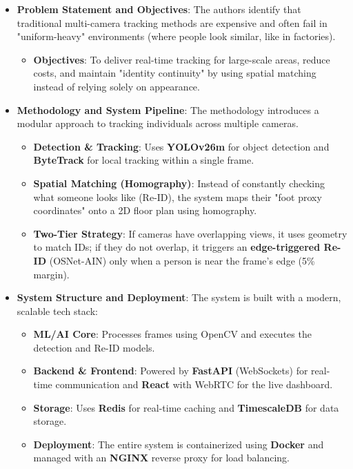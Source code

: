 \begin{itemize}
    \item \textbf{Problem Statement and Objectives}: The authors identify that traditional multi-camera tracking methods are expensive and often fail in "uniform-heavy" environments (where people look similar, like in factories).
    \begin{itemize}
        \item \textbf{Objectives}: To deliver real-time tracking for large-scale areas, reduce costs, and maintain "identity continuity" by using spatial matching instead of relying solely on appearance.
    \end{itemize}
    
    \item \textbf{Methodology and System Pipeline}: The methodology introduces a modular approach to tracking individuals across multiple cameras.
    \begin{itemize}
        \item \textbf{Detection \& Tracking}: Uses \textbf{YOLOv26m} for object detection and \textbf{ByteTrack} for local tracking within a single frame.
        \item \textbf{Spatial Matching (Homography)}: Instead of constantly checking what someone looks like (Re-ID), the system maps their "foot proxy coordinates" onto a 2D floor plan using homography.
        \item \textbf{Two-Tier Strategy}: If cameras have overlapping views, it uses geometry to match IDs; if they do not overlap, it triggers an \textbf{edge-triggered Re-ID} (OSNet-AIN) only when a person is near the frame's edge (5\% margin).
    \end{itemize}
    
    \item \textbf{System Structure and Deployment}: The system is built with a modern, scalable tech stack:
    \begin{itemize}
        \item \textbf{ML/AI Core}: Processes frames using OpenCV and executes the detection and Re-ID models.
        \item \textbf{Backend \& Frontend}: Powered by \textbf{FastAPI} (WebSockets) for real-time communication and \textbf{React} with WebRTC for the live dashboard.
        \item \textbf{Storage}: Uses \textbf{Redis} for real-time caching and \textbf{TimescaleDB} for data storage.
        \item \textbf{Deployment}: The entire system is containerized using \textbf{Docker} and managed with an \textbf{NGINX} reverse proxy for load balancing.
    \end{itemize}


\end{itemize}
